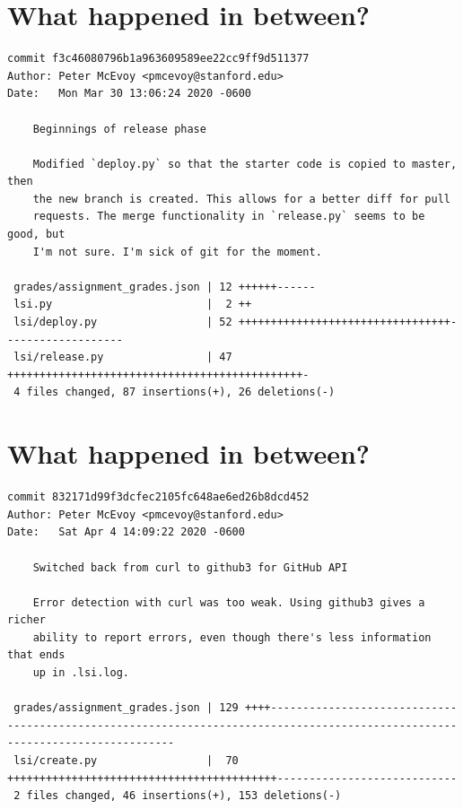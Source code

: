 \documentclass{article}
\begin{document}
\section*{What happened in between?}
\vspace{2ex}
\begin{verbatim}
commit f3c46080796b1a963609589ee22cc9ff9d511377
Author: Peter McEvoy <pmcevoy@stanford.edu>
Date:   Mon Mar 30 13:06:24 2020 -0600

    Beginnings of release phase
    
    Modified `deploy.py` so that the starter code is copied to master, then
    the new branch is created. This allows for a better diff for pull
    requests. The merge functionality in `release.py` seems to be good, but
    I'm not sure. I'm sick of git for the moment.

 grades/assignment_grades.json | 12 ++++++------
 lsi.py                        |  2 ++
 lsi/deploy.py                 | 52 +++++++++++++++++++++++++++++++++-------------------
 lsi/release.py                | 47 ++++++++++++++++++++++++++++++++++++++++++++++-
 4 files changed, 87 insertions(+), 26 deletions(-)

\end{verbatim}

\newpage

\section*{What happened in between?}
\vspace{2ex}
\begin{verbatim}
commit 832171d99f3dcfec2105fc648ae6ed26b8dcd452
Author: Peter McEvoy <pmcevoy@stanford.edu>
Date:   Sat Apr 4 14:09:22 2020 -0600

    Switched back from curl to github3 for GitHub API
    
    Error detection with curl was too weak. Using github3 gives a richer
    ability to report errors, even though there's less information that ends
    up in .lsi.log.

 grades/assignment_grades.json | 129 ++++-----------------------------------------------------------------------------------------------------------------------------
 lsi/create.py                 |  70 ++++++++++++++++++++++++++++++++++++++++++----------------------------
 2 files changed, 46 insertions(+), 153 deletions(-)
\end{verbatim}

\newpage
\end{document}
